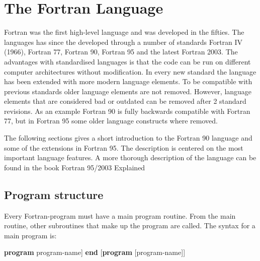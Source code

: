 \chapter{The Fortran Language}

Fortran was the first high-level language and was developed in the fifties. The languages has since the developed through a number of standards Fortran IV (1966), Fortran 77, Fortran 90, Fortran 95 and the latest Fortran 2003. The advantages with standardised languages is that the code can be run on different computer architectures without modification. In every new standard the language has been extended with more modern language elements. To be compatible with previous standards older language elements are not removed. However, language elements that are considered bad or outdated can be removed after 2 standard revisions. As an example Fortran 90 is fully backwards compatible with Fortran 77, but in Fortran 95 some
older language constructs where removed. 

The following sections gives a short introduction to the Fortran 90 language and some of the extensions in Fortran 95. The description is centered on the most important language features. A more thorough description of the language can be found in the book Fortran 95/2003 Explained \cite{metcalf00}

\section{Program structure}

Every Fortran-program must have a main program routine. From the main routine, other subroutines that make up the program are called. The syntax for a main program is:

\begin{fsyntax}
\textbf{program} program-name]\newline%
[contains]\newline%
[subroutines]\newline%
\textbf{end} [\textbf{program} [program-name]]
\end{fsyntax}

